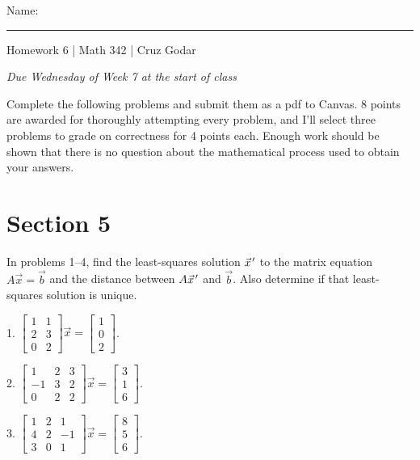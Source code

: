 \documentclass{article}
\begin{document}
\Large Name: \rule{2in}{0.15mm} \hfill Homework 6 | Math 342 | Cruz Godar \vspace{4pt}  \normalsize

\textit{Due Wednesday of Week 7 at the start of class}

Complete the following problems and submit them as a pdf to Canvas. 8 points are awarded for thoroughly attempting every problem, and I'll select three problems to grade on correctness for 4 points each. Enough work should be shown that there is no question about the mathematical process used to obtain your answers.

\section{Section 5}

In problems 1--4, find the least-squares solution $\vec{x}\hspace{0.1em}'$ to the matrix equation $A\vec{x} = \vec{b}$ and the distance between $A\vec{x}\hspace{0.1em}'$ and $\vec{b}$. Also determine if that least-squares solution is unique.

1. $\left[\begin{array}{cc} 1& 1 \\ 2& 3 \\ 0& 2 \end{array}\right]\vec{x} = \left[\begin{array}{c} 1 \\ 0 \\ 2 \end{array}\right]$.

2. $\left[\begin{array}{ccc} 1& 2& 3 \\ -1& 3& 2 \\ 0& 2& 2 \end{array}\right]\vec{x} = \left[\begin{array}{c} 3 \\ 1 \\ 6 \end{array}\right]$.

3. $\left[\begin{array}{ccc} 1& 2& 1 \\ 4& 2& -1 \\ 3& 0& 1 \end{array}\right]\vec{x} = \left[\begin{array}{c} 8 \\ 5 \\ 6 \end{array}\right]$.
\end{document}
